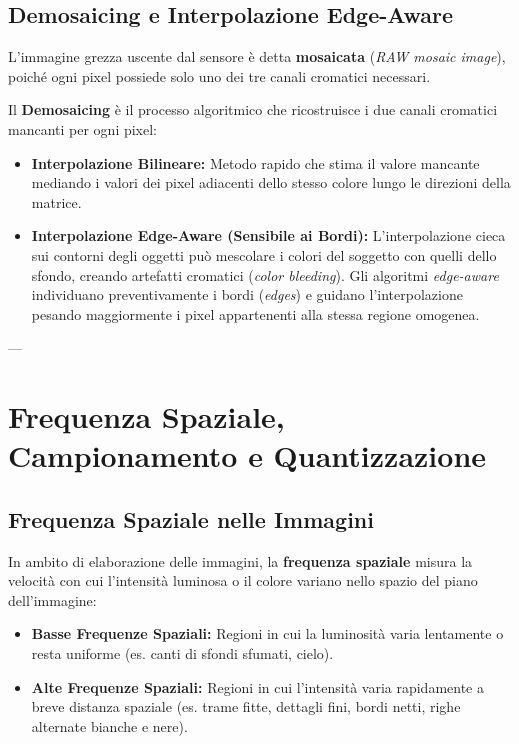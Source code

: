 \subsection{Demosaicing e Interpolazione Edge-Aware}
L'immagine grezza uscente dal sensore è detta \textbf{mosaicata} (\textit{RAW mosaic image}), poiché ogni pixel possiede solo uno dei tre canali cromatici necessari. 

Il \textbf{Demosaicing} è il processo algoritmico che ricostruisce i due canali cromatici mancanti per ogni pixel:
\begin{itemize}
    \item \textbf{Interpolazione Bilineare:} Metodo rapido che stima il valore mancante mediando i valori dei pixel adiacenti dello stesso colore lungo le direzioni della matrice.
    \item \textbf{Interpolazione Edge-Aware (Sensibile ai Bordi):} L'interpolazione cieca sui contorni degli oggetti può mescolare i colori del soggetto con quelli dello sfondo, creando artefatti cromatici (\textit{color bleeding}). Gli algoritmi \textit{edge-aware} individuano preventivamente i bordi (\textit{edges}) e guidano l'interpolazione pesando maggiormente i pixel appartenenti alla stessa regione omogenea.
\end{itemize}

---

\section{Frequenza Spaziale, Campionamento e Quantizzazione}

\subsection{Frequenza Spaziale nelle Immagini}
In ambito di elaborazione delle immagini, la \textbf{frequenza spaziale} misura la velocità con cui l'intensità luminosa o il colore variano nello spazio del piano dell'immagine:
\begin{itemize}
    \item \textbf{Basse Frequenze Spaziali:} Regioni in cui la luminosità varia lentamente o resta uniforme (es. canti di sfondi sfumati, cielo).
    \item \textbf{Alte Frequenze Spaziali:} Regioni in cui l'intensità varia rapidamente a breve distanza spaziale (es. trame fitte, dettagli fini, bordi netti, righe alternate bianche e nere).
\end{itemize}

